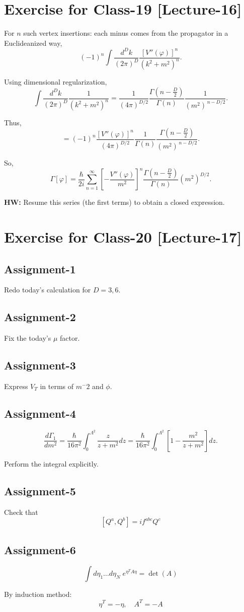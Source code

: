 \documentclass[14pt]{article} %
\begin{document}
\section{Exercise for Class-19 [Lecture-16]} 
\begin{framed}
For $n$ such vertex insertions: each minus comes from the propagator 
in a Euclideanized way,
\[
(-1)^n \int \frac{d^Dk}{(2\pi)^D} \frac{[V''(\varphi)]^n}{(k^2+m^2)^n}.
\]

Using dimensional regularization,
\[
\int \frac{d^Dk}{(2\pi)^D} \frac{1}{(k^2+m^2)^n} 
= \frac{1}{(4\pi)^{D/2}} \frac{\Gamma\!\left(n-\tfrac{D}{2}\right)}{\Gamma(n)} 
\frac{1}{(m^2)^{\,n-D/2}}.
\]

Thus,
\[
=(-1)^n \frac{[V''(\varphi)]^n}{(4\pi)^{D/2}}
\frac{1}{\Gamma(n)} \frac{\Gamma\!\left(n-\tfrac{D}{2}\right)}{(m^2)^{\,n-D/2}}.
\]

So,
\[
\Gamma[\varphi] = \frac{\hbar}{2i} \sum_{n=1}^{\infty} 
\left[ -\frac{V''(\varphi)}{m^2} \right]^n 
\frac{\Gamma\!\left(n-\tfrac{D}{2}\right)}{\Gamma(n)} 
(m^2)^{D/2}.
\]
\end{framed}
\textbf{HW:} Resume this series (the first terms) to obtain a closed expression.
\section{Exercise for Class-20 [Lecture-17]} 
\subsection{Assignment-1}
Redo today's calculation for $D=3,6$.
\subsection{Assignment-2}
    Fix the today's $\mu$ factor.
\subsection{Assignment-3}
    Express $V_T$ in terms of $m^-2$ and $\phi$.
    \subsection{Assignment-4}
    \begin{framed}
        \[
\frac{d \Gamma_1}{d m^2}
= \frac{\hbar}{16 \pi^2}
\int_0^{\Lambda^2} \frac{z}{z + m^2} dz
= \frac{\hbar}{16 \pi^2}
\int_0^{\Lambda^2} \left[ 1 - \frac{m^2}{z + m^2} \right] dz.
\]
\end{framed}
Perform the integral explicitly.
\subsection{Assignment-5}
Check that 
\[
[Q^a, Q^b] = i f^{abc} Q^c
\]
\subsection{Assignment-6}
\[
\int d\eta_1 \dots d\eta_N \; e^{\eta^T A \eta} = \det(A)
\]

By induction method:
\[
\eta^T = -\eta, \quad A^T = -A
\]
\end{document}
